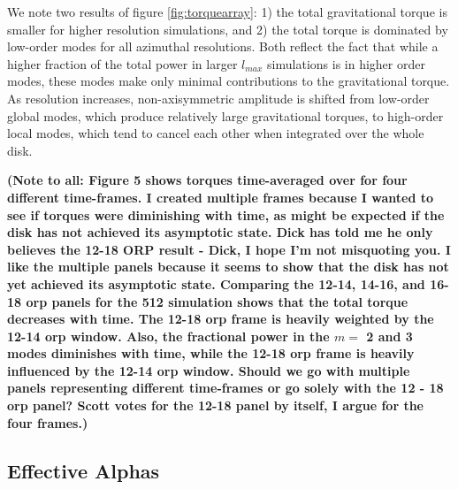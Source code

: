 \documentclass[manuscript]{aastex}
\begin{document}
We note two results of figure \ref{fig:torquearray}: 1) the total gravitational torque is smaller for higher resolution simulations, and 2) the total torque is dominated by low-order modes for all azimuthal resolutions. Both reflect the fact that while a higher fraction of the total power in larger $l_{max}$ simulations is in higher order modes, these modes make only minimal contributions to the gravitational torque. As resolution increases, non-axisymmetric amplitude is shifted from low-order global modes, which produce relatively large gravitational torques, to high-order local modes, which tend to cancel each other when integrated over the whole disk. 

{\bf (Note to all: Figure 5 shows torques
time-averaged over for four different time-frames.  I created multiple frames because I wanted to see if torques were 
diminishing with time, as might be expected if the disk has not achieved its asymptotic state.  
Dick has told me he only believes the 12-18 ORP result - Dick, I hope 
I'm not misquoting you.  I like the multiple panels because it seems to show that the disk has not yet achieved 
its asymptotic state.  Comparing the 12-14, 14-16, and 16-18 orp panels for
the 512 simulation shows that the total torque decreases with time.  The 12-18 orp frame is heavily weighted
by the 12-14 orp window.  Also, the fractional power in the $m =$ 2 and 3 modes diminishes with time, while the 12-18 orp
frame is heavily influenced by the 12-14 orp window.  Should we go with multiple panels representing different time-frames or 
go solely with the 12 - 18 orp panel?  Scott votes for the 12-18 panel by itself, I argue for the four frames.)
} 

\subsection{Effective Alphas}


\end{document}
